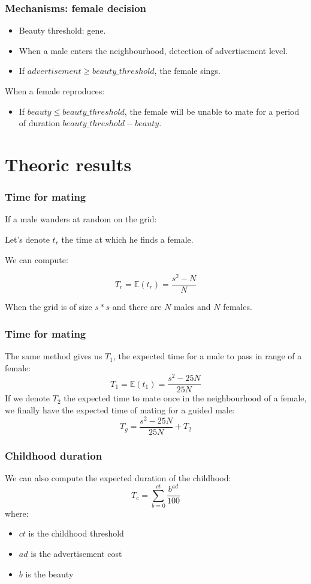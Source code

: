 \documentclass{beamer}
\begin{document}
\begin{frame}
\frametitle{Mechanisms: female decision}
\begin{itemize}
\item Beauty threshold: gene.
\item When a male enters the neighbourhood, detection of advertisement level.
\item If $advertisement \geq beauty\_threshold$, the female sings.
\end{itemize}
When a female reproduces:
\begin{itemize}
\item If $beauty \leq beauty\_threshold$, the female will be unable to mate for a period of duration $beauty\_threshold - beauty$.
\end{itemize}
\end{frame}

\section{Theoric results}

\begin{frame}
\frametitle{Time for mating}
If a male wanders at random on the grid:

Let's denote $t_r$ the time at which he finds a female.

We can compute:

$$T_r = \mathbb{E}(t_r) = \frac{s^2 - N}{N}$$

When the grid is of size $s*s$ and there are $N$ males and $N$ females.
\end{frame}

\begin{frame}
\frametitle{Time for mating}
The same method gives us $T_1$, the expected time for a male to pass in range of a female:
$$T_1 = \mathbb{E}(t_1) = \frac{s^2 - 25 N}{25 N}$$
If we denote $T_2$ the expected time to mate once in the neighbourhood of a female, we finally have the expected time of mating for a guided male:
$$T_g  = \frac{s^2 - 25N}{25 N} + T_2$$
\end{frame}

\begin{frame}
\frametitle{Childhood duration}
We can also compute the expected duration of the childhood:
$$T_c = \sum_{b=0}^{ct} \frac{b^{ad}}{100}$$
where:
\begin{itemize}
\item $ct$ is the childhood threshold
\item $ad$ is the advertisement cost
\item $b$ is the beauty
\end{itemize}
\end{frame}
\end{document}
